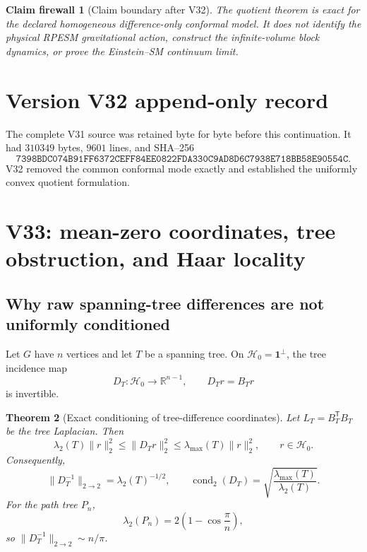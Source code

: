 \documentclass[11pt]{article}
\newtheorem{theorem}{Theorem}[section]
\newtheorem{firewall}[theorem]{Claim firewall}
\theoremstyle{remark}
\begin{document}
\begin{firewall}[Claim boundary after V32]
\label{fire:v17v32}
The quotient theorem is exact for the declared homogeneous
difference-only conformal model.  It does not identify the physical
RPESM gravitational action, construct the infinite-volume block
dynamics, or prove the Einstein--SM continuum limit.
\end{firewall}

\section*{Version V32 append-only record}
The complete V31 source was retained byte for byte before this
continuation.  It had \(310349\) bytes, \(9601\) lines, and SHA--256
\[
 \texttt{7398BDC074B91FF6372CEFF84EE0822FDA330C9AD8D6C7938E718BB58E90554C}.
\]
V32 removed the common conformal mode exactly and established the
uniformly convex quotient formulation.


\section{V33: mean-zero coordinates, tree obstruction, and Haar locality}
\label{sec:v17v33}

\subsection{Why raw spanning-tree differences are not uniformly conditioned}

Let \(G\) have \(n\) vertices and let \(T\) be a spanning tree.  On
\(\mathcal H_0=\mathbf1^\perp\), the tree incidence map
\[
 D_T:\mathcal H_0\longrightarrow\mathbb R^{n-1},
 \qquad D_Tr=B_Tr                                  \tag{33.1}
\]
is invertible.

\begin{theorem}[Exact conditioning of tree-difference coordinates]
\label{thm:v17v33-tree}
Let \(L_T=B_T^{\mathsf T}B_T\) be the tree Laplacian.  Then
\[
 \lambda_2(T)\|r\|_2^2
 \leq\|D_Tr\|_2^2
 \leq\lambda_{\max}(T)\|r\|_2^2,
 \qquad r\in\mathcal H_0.                          \tag{33.2}
\]
Consequently,
\[
 \|D_T^{-1}\|_{2\to2}=\lambda_2(T)^{-1/2},
 \qquad
 \operatorname{cond}_2(D_T)
 =\sqrt{\frac{\lambda_{\max}(T)}{\lambda_2(T)}}.  \tag{33.3}
\]
For the path tree \(P_n\),
\[
 \lambda_2(P_n)=2\left(1-\cos\frac{\pi}{n}\right),              \tag{33.4}
\]
so \(\|D_T^{-1}\|_{2\to2}\sim n/\pi\).
\end{theorem}
\end{document}
